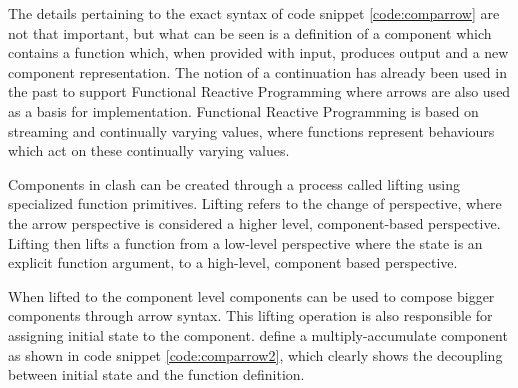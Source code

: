 The details pertaining to the exact syntax of code snippet \ref{code:comparrow} are not that important, but what can be seen is a definition of a component which contains a function which, when provided with input, produces output and a new component representation. 
The notion of a continuation has already been used in the past to support Functional Reactive Programming\cite{wan2000functional,hudak2003arrows,ElliottHudak97:Fran} where arrows are also used as a basis for implementation.
Functional Reactive Programming is based on streaming and continually varying values, where functions represent behaviours which act on these continually varying values.

%

Components in \gls{clash} can be created through a process called lifting using specialized function primitives.
Lifting refers to the change of perspective, where the arrow perspective is considered a higher level, component-based perspective.
Lifting then lifts a function from a low-level perspective where the state is an explicit function argument, to a high-level, component based perspective.

When lifted to the component level components can be used to compose bigger components through arrow syntax.
This lifting operation is also responsible for assigning initial state to the component.
\citeauthor{gerards2011higher} define a multiply-accumulate component as shown in code snippet \ref{code:comparrow2}, which clearly shows the decoupling between initial state and the function definition. 

